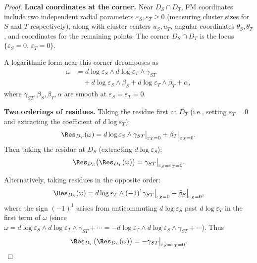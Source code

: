 \begin{proof}
\textbf{Local coordinates at the corner.}
Near $D_S \cap D_T$, FM coordinates include two independent radial parameters $\varepsilon_S, \varepsilon_T \geq 0$ (measuring cluster sizes for $S$ and $T$ respectively), along with cluster centers $u_S, u_T$, angular coordinates $\theta_S, \theta_T$, and coordinates for the remaining points. The corner $D_S \cap D_T$ is the locus $\{\varepsilon_S = 0,\, \varepsilon_T = 0\}$.

A logarithmic form near this corner decomposes as
\begin{align*}
\omega &= d\log\varepsilon_S \wedge d\log\varepsilon_T \wedge \gamma_{ST} \\
&\quad + d\log\varepsilon_S \wedge \beta_S + d\log\varepsilon_T \wedge \beta_T + \alpha,
\end{align*}
where $\gamma_{ST}, \beta_S, \beta_T, \alpha$ are smooth at $\varepsilon_S = \varepsilon_T = 0$.

\textbf{Two orderings of residues.}
Taking the residue first at $D_T$ (i.e., setting $\varepsilon_T = 0$ and extracting the coefficient of $d\log\varepsilon_T$):
\[
\Res_{D_T}(\omega) = d\log\varepsilon_S \wedge \gamma_{ST}\big|_{\varepsilon_T=0} + \beta_T\big|_{\varepsilon_T=0}.
\]
Then taking the residue at $D_S$ (extracting $d\log\varepsilon_S$):
\[
\Res_{D_S}\bigl(\Res_{D_T}(\omega)\bigr) = \gamma_{ST}\big|_{\varepsilon_S=\varepsilon_T=0}.
\]

Alternatively, taking residues in the opposite order:
\[
\Res_{D_S}(\omega) = d\log\varepsilon_T \wedge (-1)^1 \gamma_{ST}\big|_{\varepsilon_S=0} + \beta_S\big|_{\varepsilon_S=0},
\]
where the sign $(-1)^1$ arises from anticommuting $d\log\varepsilon_S$ past $d\log\varepsilon_T$ in the first term of $\omega$ (since $\omega = d\log\varepsilon_S \wedge d\log\varepsilon_T \wedge \gamma_{ST} + \cdots = -d\log\varepsilon_T \wedge d\log\varepsilon_S \wedge \gamma_{ST} + \cdots$). Thus
\[
\Res_{D_T}\bigl(\Res_{D_S}(\omega)\bigr) = -\gamma_{ST}\big|_{\varepsilon_S=\varepsilon_T=0}.
\]


\end{proof}
